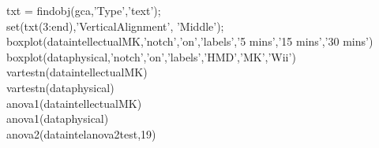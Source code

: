
txt = findobj(gca,'Type','text');\\
set(txt(3:end),'VerticalAlignment', 'Middle');\\
boxplot(dataintellectualMK,'notch','on','labels',{'5 mins','15 mins','30 mins'})\\
boxplot(dataphysical,'notch','on','labels',{'HMD','MK','Wii'})\\
vartestn(dataintellectualMK)\\
vartestn(dataphysical)\\
anova1(dataintellectualMK)\\
anova1(dataphysical)\\
anova2(dataintelanova2test,19)\\
